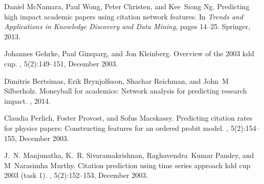 \documentclass[journal]{IEEEtran}
\begin{document}
\begin{thebibliography}{1}
Daniel McNamara, Paul Wong, Peter Christen, and Kee~Siong Ng.
\newblock Predicting high impact academic papers using citation network
  features.
\newblock In {\em Trends and Applications in Knowledge Discovery and Data
  Mining}, pages 14--25. Springer, 2013.

Johannes Gehrke, Paul Ginsparg, and Jon Kleinberg.
\newblock Overview of the 2003 kdd cup.
, 5(2):149--151, December 2003.

Dimitris Bertsimas, Erik Brynjolfsson, Shachar Reichman, and John~M Silberholz.
\newblock Moneyball for academics: Network analysis for predicting research
  impact.
, 2014.

Claudia Perlich, Foster Provost, and Sofus Macskassy.
\newblock Predicting citation rates for physics papers: Constructing features
  for an ordered probit model.
, 5(2):154--155, December 2003.

J.~N. Manjunatha, K.~R. Sivaramakrishnan, Raghavendra~Kumar Pandey, and
  M~Narasimha Murthy.
\newblock Citation prediction using time series approach kdd cup 2003 (task 1).
, 5(2):152--153, December 2003.
  
\end{thebibliography}
 
\end{document}

